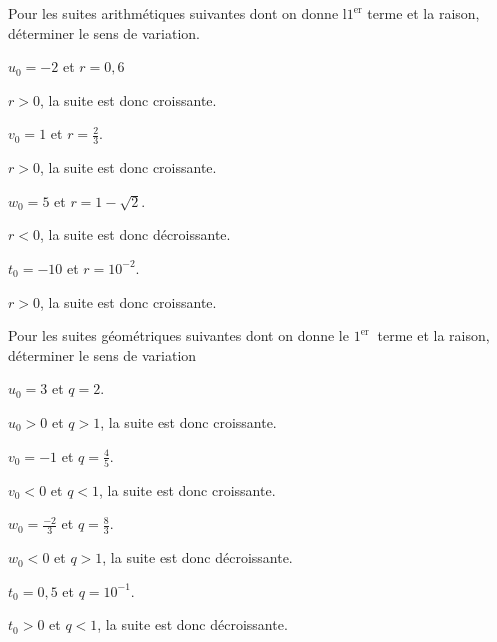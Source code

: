 \documentclass[12pt,a4paper]{article}  %
\begin{document}
Pour les suites arithmétiques suivantes dont on donne $\mathrm{l} \mathrm{}1^{\textrm{er}}$ terme et la raison, déterminer le sens de variation.
\begin{enumMet}
    \item $u_{0}=-2$ et $r=0,6$\\
    \begin{corrBox}
        $r>0$, la suite est donc croissante. \quad{}
    \end{corrBox}
    \item $v_{0}=1$ et $r=\frac{2}{3}$.\\
    \begin{corrBox}
        $r>0$, la suite est donc croissante. \quad{}
    \end{corrBox}
    \item $w_{0}=5$ et $r=1-\sqrt{2}$.\\
    \begin{corrBox}
        $r<0$, la suite est donc décroissante. \quad{}
    \end{corrBox}
    \item $t_{0}=-10$ et $r=10^{-2}$.\\
    \begin{corrBox}
        $r>0$, la suite est donc croissante. \quad{}
    \end{corrBox}
\end{enumMet}

Pour les suites géométriques suivantes dont on donne le $1^{\text {er }}$ terme et la raison, déterminer le sens de variation
\begin{enumMet}
    \item $u_{0}=3$ et $q=2$.\\
    \begin{corrBox}
        $u_0>0$ et $q>1$, la suite est donc croissante. \quad{}
    \end{corrBox}
    \item $v_{0}=-1$ et $q=\frac{4}{5}$.\\
    \begin{corrBox}
        $v_0<0$ et $q<1$, la suite est donc croissante. \quad{}
    \end{corrBox}
    \item $w_{0}=\frac{-2}{3}$ et $q=\frac{8}{3}$.\\
    \begin{corrBox}
        $w_0<0$ et $q>1$, la suite est donc décroissante. \quad{}
    \end{corrBox}
    \item $t_{0}=0,5$ et $q=10^{-1}$.\\
    \begin{corrBox}
        $t_0>0$ et $q<1$, la suite est donc décroissante. \quad{}
    \end{corrBox}
\end{enumMet}
\end{document}
